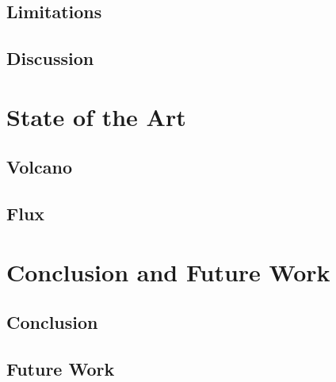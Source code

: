 \section{Limitations}

\section{Discussion}


\chapter{State of the Art}
\section{Volcano}

\section{Flux}


\chapter{Conclusion and Future Work}
\section{Conclusion}

\section{Future Work}






